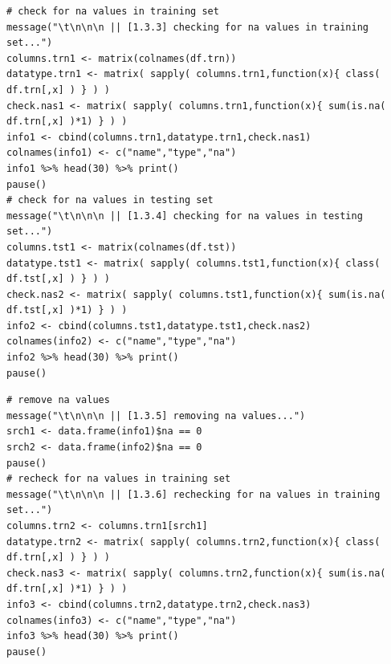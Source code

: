 \documentclass[10pt, twoside]{article}
\begin{document}
\begin{verbatim}
# check for na values in training set
message("\t\n\n\n || [1.3.3] checking for na values in training set...")
columns.trn1 <- matrix(colnames(df.trn))
datatype.trn1 <- matrix( sapply( columns.trn1,function(x){ class( df.trn[,x] ) } ) )
check.nas1 <- matrix( sapply( columns.trn1,function(x){ sum(is.na( df.trn[,x] )*1) } ) )
info1 <- cbind(columns.trn1,datatype.trn1,check.nas1)
colnames(info1) <- c("name","type","na")
info1 %>% head(30) %>% print()
pause()
# check for na values in testing set
message("\t\n\n\n || [1.3.4] checking for na values in testing set...")
columns.tst1 <- matrix(colnames(df.tst))
datatype.tst1 <- matrix( sapply( columns.tst1,function(x){ class( df.tst[,x] ) } ) )
check.nas2 <- matrix( sapply( columns.tst1,function(x){ sum(is.na( df.tst[,x] )*1) } ) )
info2 <- cbind(columns.tst1,datatype.tst1,check.nas2)
colnames(info2) <- c("name","type","na")
info2 %>% head(30) %>% print()
pause()
\end{verbatim}

\begin{verbatim}
# remove na values
message("\t\n\n\n || [1.3.5] removing na values...")
srch1 <- data.frame(info1)$na == 0
srch2 <- data.frame(info2)$na == 0
pause()
# recheck for na values in training set
message("\t\n\n\n || [1.3.6] rechecking for na values in training set...")
columns.trn2 <- columns.trn1[srch1]
datatype.trn2 <- matrix( sapply( columns.trn2,function(x){ class( df.trn[,x] ) } ) )
check.nas3 <- matrix( sapply( columns.trn2,function(x){ sum(is.na( df.trn[,x] )*1) } ) )
info3 <- cbind(columns.trn2,datatype.trn2,check.nas3)
colnames(info3) <- c("name","type","na")
info3 %>% head(30) %>% print()
pause()
\end{verbatim}
\end{document}
